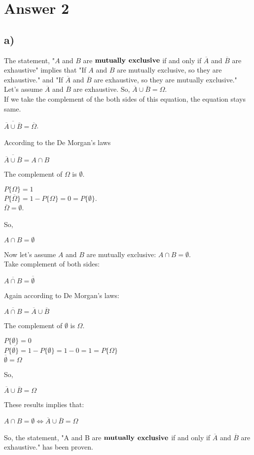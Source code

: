 \documentclass[12pt]{article}
\begin{document}
\section*{Answer 2}
\subsection*{a)}
The statement, "$A$ and $B$ are $\bold{mutually}$ $\bold{exclusive}$ if and only if $\overline{A}$ and $\overline{B}$ are exhaustive" implies that "If $A$ and $B$ are mutually exclusive, so they are exhaustive." and "If $\overline{A}$ and $\overline{B}$ are exhaustive, so they are mutually exclusive."\\

Let's assume $\overline{A}$ and $\overline{B}$ are exhaustive. So, $\overline{A} \cup \overline{B} = \Omega $.\\
If we take the complement of the both sides of this equation, the equation stays same.  
\begin{center}
    $\overline{\overline{A} \cup \overline{B}} = \overline{\Omega}$.
\end{center}
According to the De Morgan's laws
\begin{center}
    $\overline{\overline{A} \cup \overline{B}} = A \cap B$
\end{center}
The complement of $\Omega$ is $\emptyset$.\\
\begin{center}
    $P\{\Omega\} = 1$\\
$P\{\overline{\Omega}\} = 1 - P\{\Omega\} = 0 = P\{\emptyset\}$.\\
$\overline{\Omega} = \emptyset$.
\end{center}
 So, 
\begin{center}
    $A \cap B = \emptyset$
\end{center} 
Now let's assume $A$ and $B$ are mutually exclusive: $A \cap B = \emptyset$.\\
Take complement of both sides: \\
\begin{center}
    $\overline{A \cap B} = \overline{\emptyset}$
\end{center}
Again according to De Morgan's laws:
\begin{center}
    $\overline{A \cap B} = \overline{A} \cup \overline{B}$
\end{center}
The complement of $\emptyset$ is $\Omega$.
\begin{center}
    $P\{\emptyset\} = 0$\\
    $P\{\overline{\emptyset\}} = 1 - P\{\emptyset\} = 1 - 0 = 1 = P\{\Omega\}$\\
    $\overline{\emptyset} = \Omega$ 
\end{center}
So,
\begin{center}
    $\overline{A} \cup \overline{B} = \Omega$
\end{center}
These results implies that:
\begin{center}
    $A \cap B = \emptyset \Longleftrightarrow \overline{A} \cup \overline{B} = \Omega$\
\end{center}
So, the statement, "A and B are $\bold{mutually}$ $\bold{exclusive}$ if and only if $\overline{A}$ and $\overline{B}$ are exhaustive." has been proven.
\end{document}
